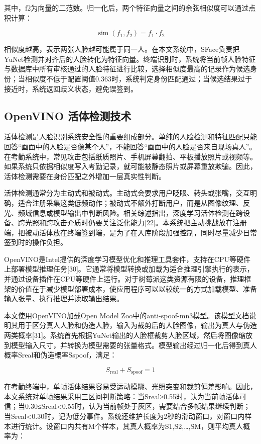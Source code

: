\documentclass[UTF8]{heuthesis}
\begin{document}
其中，f2为向量的二范数。归一化后，两个特征向量之间的余弦相似度可以通过点积计算：

\begin{equation*}
\operatorname{sim}(f_1,f_2)=f_1\cdot f_2\tag{2.2}
\end{equation*}

相似度越高，表示两张人脸越可能属于同一人。在本文系统中，SFace负责把YuNet检测并对齐后的人脸转化为特征向量。终端识别时，系统将当前帧人脸特征与数据库中所有审核通过的人脸特征进行比较，选择相似度最高的记录作为候选身份；当相似度不低于配置阈值0.363时，系统判定身份匹配通过；当候选结果过于接近时，系统返回歧义状态，避免误签到。

\subsection{OpenVINO 活体检测技术}
活体检测是人脸识别系统安全性的重要组成部分。单纯的人脸检测和特征匹配只能回答“画面中的人脸是否像某个人”，不能回答“画面中的人脸是否来自现场真人”。在考勤系统中，常见攻击包括纸质照片、手机屏幕翻拍、平板播放照片或视频等。如果系统只依据相似度写入考勤记录，就可能被静态照片或屏幕重放欺骗。因此，活体检测需要在身份匹配之外增加一层真实性判断。

活体检测通常分为主动式和被动式。主动式会要求用户眨眼、转头或张嘴，交互明确，适合注册采集这类低频动作；被动式不额外打断用户，而是从图像纹理、反光、频域信息或模型输出中判断风险。相关综述指出，深度学习活体检测在跨设备、跨光照和跨攻击介质时仍要关注泛化能力[22]。本系统把主动挑战放在注册端，把被动活体放在终端签到端，是为了在入库阶段加强控制，同时尽量减少日常签到时的操作负担。

OpenVINO是Intel提供的深度学习模型优化和推理工具套件，支持在CPU等硬件上部署模型推理任务[30]。它通常将模型转换或加载为适合推理引擎执行的表示，并通过设备插件在CPU等硬件上运行。对于树莓派这类资源有限的设备，推理框架的价值在于减少模型部署成本，使应用程序可以以较统一的方式加载模型、准备输入张量、执行推理并读取输出结果。

本文使用OpenVINO加载Open Model Zoo中的anti-spoof-mn3模型。该模型文档说明其用于区分真人人脸和伪造人脸，输入为裁剪后的人脸图像，输出为真人与伪造两类概率[31]。系统首先根据YuNet输出的人脸框裁剪人脸区域，然后将图像缩放到模型输入尺寸，并转换为模型需要的张量格式。模型输出经过归一化后得到真人概率Sreal和伪造概率Sspoof，满足：

\begin{equation*}
S_{\mathrm{real}}+S_{\mathrm{spoof}}=1\tag{2.3}
\end{equation*}

在考勤终端中，单帧活体结果容易受运动模糊、光照突变和裁剪偏差影响。因此，本文系统对单帧结果采用三区间判断策略：当Sreal≥0.55时，认为当前帧活体可信；当0.30≤Sreal\textless{}0.55时，认为当前帧处于灰区，需要结合多帧结果继续判断；当Sreal\textless{}0.30时，记为低分事件。系统还维护长度为2秒的滑动窗口，对窗口内样本进行统计。设窗口内共有M个样本，其真人概率为S1,S2,…,SM，则平均真人概率为：
\end{document}
